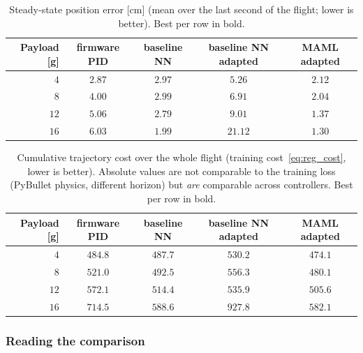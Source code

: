 \documentclass[11pt,a4paper]{article}
\theoremstyle{remark}
\numberwithin{equation}{section}
\begin{document}
\begin{table}[H]
    \centering
    \caption{Steady-state position error [cm] (mean over the last second of the
    flight; lower is better). Best per row in bold.}
    \label{tab:maml_sse}
    \small
    \begin{tabular}{r cccc}
        \toprule
        Payload [g] & firmware PID & baseline NN & baseline NN adapted & MAML adapted \\
        \midrule
        $4$  & $2.87$ & $2.97$ & $5.26$  & $\mathbf{2.12}$ \\
        $8$  & $4.00$ & $2.99$ & $6.91$  & $\mathbf{2.04}$ \\
        $12$ & $5.06$ & $2.79$ & $9.01$  & $\mathbf{1.37}$ \\
        $16$ & $6.03$ & $1.99$ & $21.12$ & $\mathbf{1.30}$ \\
        \bottomrule
    \end{tabular}
\end{table}

\begin{table}[H]
    \centering
    \caption{Cumulative trajectory cost over the whole flight (training
    cost~\eqref{eq:reg_cost}, lower is better). Absolute values are not
    comparable to the training loss (PyBullet physics, different horizon) but
    \emph{are} comparable across controllers. Best per row in bold.}
    \label{tab:maml_tloss}
    \small
    \begin{tabular}{r cccc}
        \toprule
        Payload [g] & firmware PID & baseline NN & baseline NN adapted & MAML adapted \\
        \midrule
        $4$  & $484.8$ & $487.7$ & $530.2$ & $\mathbf{474.1}$ \\
        $8$  & $521.0$ & $492.5$ & $556.3$ & $\mathbf{480.1}$ \\
        $12$ & $572.1$ & $514.4$ & $535.9$ & $\mathbf{505.6}$ \\
        $16$ & $714.5$ & $588.6$ & $927.8$ & $\mathbf{582.1}$ \\
        \bottomrule
    \end{tabular}
\end{table}

\subsubsection*{Reading the comparison}
\end{document}
